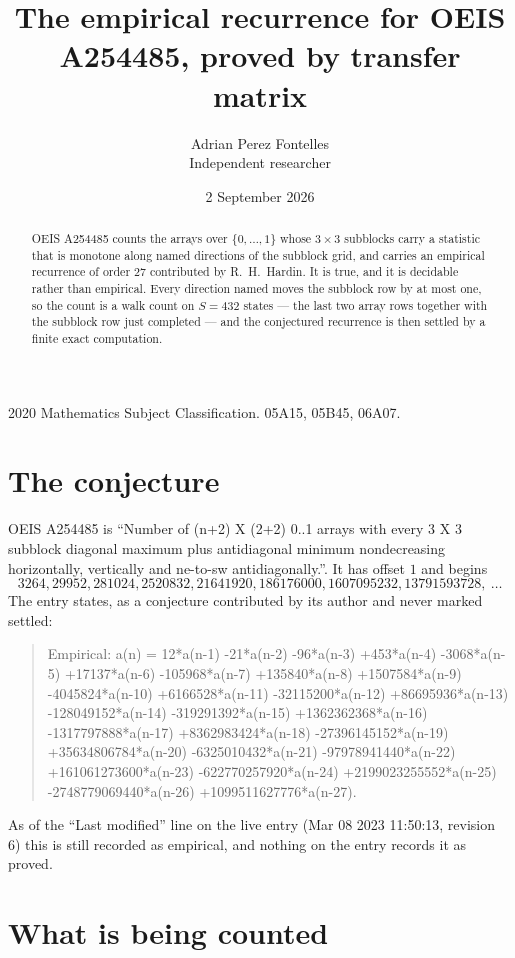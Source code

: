 \documentclass[11pt,a4paper]{article}
\title{The empirical recurrence for OEIS A254485, proved by transfer matrix}
\author{Adrian Perez Fontelles\\ \small Independent researcher}
\date{2 September 2026}
\theoremstyle{plain}
\theoremstyle{definition}
\begin{document}
\maketitle

\begin{abstract}
OEIS A254485 counts the arrays over $\{0,\dots,1\}$ whose $3\times3$ subblocks carry a
statistic that is monotone along named directions of the subblock grid, and carries an
empirical recurrence of order $27$ contributed by R.~H.~Hardin. It is true, and it is
decidable rather than empirical. Every direction named moves the subblock row by at most one,
so the count is a walk count on $S=432$ states --- the last two array rows together with the
subblock row just completed --- and the conjectured recurrence is then settled by a finite
exact computation.
\end{abstract}

\noindent\small 2020 Mathematics Subject Classification. 05A15, 05B45, 06A07.\normalsize

\section{The conjecture}

OEIS A254485 is ``Number of (n+2) X (2+2) 0..1 arrays with every 3 X 3 subblock diagonal maximum plus antidiagonal minimum nondecreasing horizontally, vertically and ne-to-sw antidiagonally.''. It has offset $1$ and begins
\[
3264, 29952, 281024, 2520832, 21641920, 186176000, 1607095232, 13791593728,\ \dots
\]
The entry states, as a conjecture contributed by its author and never marked settled:
\begin{quote}
Empirical: a(n) = 12*a(n-1) -21*a(n-2) -96*a(n-3) +453*a(n-4) -3068*a(n-5) +17137*a(n-6) -105968*a(n-7) +135840*a(n-8) +1507584*a(n-9) -4045824*a(n-10) +6166528*a(n-11) -32115200*a(n-12) +86695936*a(n-13) -128049152*a(n-14) -319291392*a(n-15) +1362362368*a(n-16) -1317797888*a(n-17) +8362983424*a(n-18) -27396145152*a(n-19) +35634806784*a(n-20) -6325010432*a(n-21) -97978941440*a(n-22) +161061273600*a(n-23) -622770257920*a(n-24) +2199023255552*a(n-25) -2748779069440*a(n-26) +1099511627776*a(n-27).
\end{quote}
As of the ``Last modified'' line on the live entry (Mar 08 2023 11:50:13, revision 6) this is still
recorded as empirical, and nothing on the entry records it as proved.

\section{What is being counted}
\end{document}
